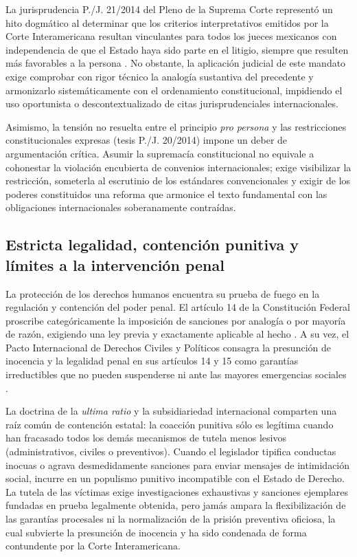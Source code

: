 \documentclass[12pt,spanish,letterpaper,oneside]{article}
\begin{document}
La jurisprudencia P./J. 21/2014 del Pleno de la Suprema Corte represent\'o un hito dogm\'atico al determinar que los criterios interpretativos emitidos por la Corte Interamericana resultan vinculantes para todos los jueces mexicanos con independencia de que el Estado haya sido parte en el litigio, siempre que resulten m\'as favorables a la persona \citep{scjnInteramericana2014ADH}. No obstante, la aplicaci\'on judicial de este mandato exige comprobar con rigor t\'ecnico la analog\'ia sustantiva del precedente y armonizarlo sistem\'aticamente con el ordenamiento constitucional, impidiendo el uso oportunista o descontextualizado de citas jurisprudenciales internacionales.

Asimismo, la tensi\'on no resuelta entre el principio \emph{pro persona} y las restricciones constitucionales expresas (tesis P./J. 20/2014) impone un deber de argumentaci\'on cr\'itica. Asumir la supremac\'ia constitucional no equivale a cohonestar la violaci\'on encubierta de convenios internacionales; exige visibilizar la restricci\'on, someterla al escrutinio de los est\'andares convencionales y exigir de los poderes constituidos una reforma que armonice el texto fundamental con las obligaciones internacionales soberanamente contra\'idas.

\subsection{Estricta legalidad, contenci\'on punitiva y l\'imites a la intervenci\'on penal}

La protecci\'on de los derechos humanos encuentra su prueba de fuego en la regulaci\'on y contenci\'on del poder penal. El art\'iculo 14 de la Constituci\'on Federal proscribe categ\'oricamente la imposici\'on de sanciones por analog\'ia o por mayor\'ia de raz\'on, exigiendo una ley previa y exactamente aplicable al hecho \citep{cpeumADH2026}. A su vez, el Pacto Internacional de Derechos Civiles y Pol\'iticos consagra la presunci\'on de inocencia y la legalidad penal en sus art\'iculos 14 y 15 como garant\'ias irreductibles que no pueden suspenderse ni ante las mayores emergencias sociales \citep{onuPactoDerechosCivilesPoliticos1966}.

La doctrina de la \emph{ultima ratio} y la subsidiariedad internacional comparten una ra\'iz com\'un de contenci\'on estatal: la coacci\'on punitiva s\'olo es leg\'itima cuando han fracasado todos los dem\'as mecanismos de tutela menos lesivos (administrativos, civiles o preventivos). Cuando el legislador tipifica conductas inocuas o agrava desmedidamente sanciones para enviar mensajes de intimidaci\'on social, incurre en un populismo punitivo incompatible con el Estado de Derecho. La tutela de las v\'ictimas exige investigaciones exhaustivas y sanciones ejemplares fundadas en prueba legalmente obtenida, pero jam\'as ampara la flexibilizaci\'on de las garant\'ias procesales ni la normalizaci\'on de la prisi\'on preventiva oficiosa, la cual subvierte la presunci\'on de inocencia y ha sido condenada de forma contundente por la Corte Interamericana.
\end{document}
